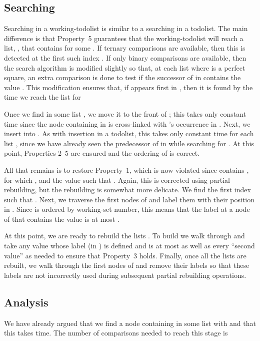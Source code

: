 \documentclass{patmorin}
\begin{document}
\subsection{Searching}

Searching in a working-todolist is similar to a searching in a todolist.
The main
difference is that Property~5 guarantees that the working-todolist will reach
a list, , that contains  for some .
If ternary comparisons are available, then this is detected at the
first such index .  If only binary comparisons are available, then
the search algorithm is modified slightly so that, at each list 
where  is a perfect square, an extra comparison is done to test if
the successor of  in  contains the value .  This modification
ensures that, if  appears first in , then it is found by the
time we reach the list  for


Once we find  in some list , we move it to the front of ;
this takes only constant time since the node containing  in 
is cross-linked with 's occurrence in .  Next, we insert  into
.  As with insertion in a todolist, this takes only
constant time for each list , since we have already seen the predecessor
of  in  while searching for .  
At this point, Properties 2--5 are ensured and the ordering of  is
correct.  

All that remains is to restore Property~1, which is now violated
since  contains , for which , and the value  such
that .  Again, this is corrected using partial rebuilding,
but the rebuilding is somewhat more delicate.  We find the first index
 such that .  Next, we traverse the first
 nodes of  and label them with their position in .
Since  is ordered by working-set number, this means that the label
at a node of  that contains the value  is at most .

At this point, we are ready to rebuild the lists . To
build  we walk through  and take any value whose label
(in ) is defined and is at most  as well as every
``second value'' as needed to ensure that Property~3 holds.  Finally,
once all the lists  are rebuilt, we walk through the first
 nodes of  and remove their labels so that these labels
are not incorrectly used during subsequent partial rebuilding operations.

\subsection{Analysis}

We have already argued that we find a node containing  in some list
 with  and that this
takes  time.  The number of comparisons needed to reach
this stage is
\end{document}

